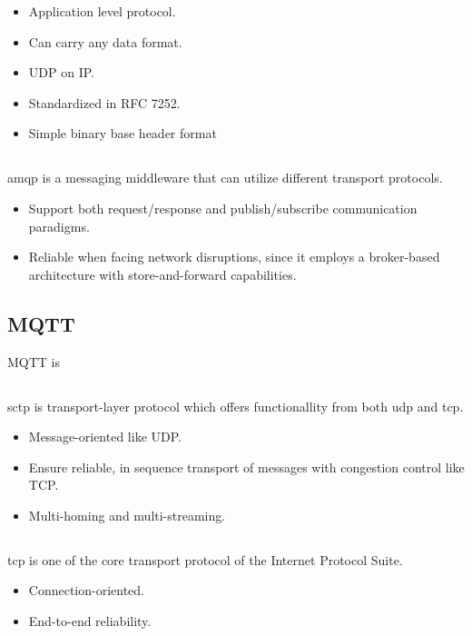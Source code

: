 \documentclass[USenglish]{ifimaster}
\begin{document}
\begin{itemize}
    \item Application level protocol.
    \item Can carry any data format.
    \item UDP on IP.
    \item Standardized in RFC 7252.
    \item Simple binary base header format
\end{itemize}


\subsection{}

\gls{amqp} is a messaging middleware that can utilize different transport
protocols.

\begin{itemize}
    \item Support both request/response and publish/subscribe communication
    paradigms.
    \item Reliable when facing network disruptions, since it employs a
    broker-based architecture with store-and-forward capabilities.
\end{itemize}

\subsection{MQTT}
MQTT is

\subsection{}

\gls{sctp} is transport-layer protocol which offers functionallity from both \gls{udp} and \gls{tcp}.
\begin{itemize}
    \item Message-oriented like UDP.
    \item Ensure reliable, in sequence transport of messages with congestion control like TCP.
    \item Multi-homing and multi-streaming.
\end{itemize}


\subsection{}
\gls{tcp} is one of the core transport protocol of the Internet Protocol Suite.
\begin{itemize}
    \item Connection-oriented.
    \item End-to-end reliability.
\end{itemize}
\end{document}
